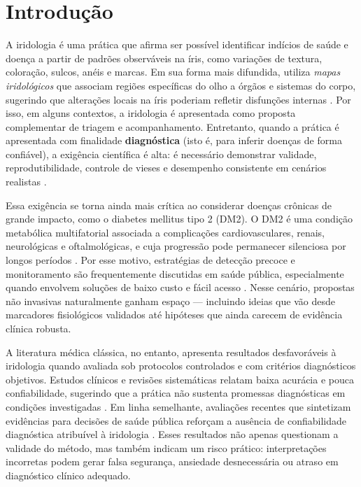 \documentclass[12pt,a4paper]{article}
\begin{document}
\section{Introdução}
A iridologia é uma prática que afirma ser possível identificar indícios de saúde e doença a partir de padrões observáveis na íris, como variações de textura, coloração, sulcos, anéis e marcas. Em sua forma mais difundida, utiliza \textit{mapas iridológicos} que associam regiões específicas do olho a órgãos e sistemas do corpo, sugerindo que alterações locais na íris poderiam refletir disfunções internas \citep{Ernst2000ArchOphthalmol}. Por isso, em alguns contextos, a iridologia é apresentada como proposta complementar de triagem e acompanhamento. Entretanto, quando a prática é apresentada com finalidade \textbf{diagnóstica} (isto é, para inferir doenças de forma confiável), a exigência científica é alta: é necessário demonstrar validade, reprodutibilidade, controle de vieses e desempenho consistente em cenários realistas \citep{AusGovIridology2025}.

Essa exigência se torna ainda mais crítica ao considerar doenças crônicas de grande impacto, como o diabetes mellitus tipo 2 (DM2). O DM2 é uma condição metabólica multifatorial associada a complicações cardiovasculares, renais, neurológicas e oftalmológicas, e cuja progressão pode permanecer silenciosa por longos períodos \citep{WHOdiabetes2024}. Por esse motivo, estratégias de detecção precoce e monitoramento são frequentemente discutidas em saúde pública, especialmente quando envolvem soluções de baixo custo e fácil acesso \citep{WHOdiabetes2024}. Nesse cenário, propostas não invasivas naturalmente ganham espaço --- incluindo ideias que vão desde marcadores fisiológicos validados até hipóteses que ainda carecem de evidência clínica robusta.

A literatura médica clássica, no entanto, apresenta resultados desfavoráveis à iridologia quando avaliada sob protocolos controlados e com critérios diagnósticos objetivos. Estudos clínicos e revisões sistemáticas relatam baixa acurácia e pouca confiabilidade, sugerindo que a prática não sustenta promessas diagnósticas em condições investigadas \citep{Simon1979JAMA, Knipschild1988BMJ, Ernst2000ArchOphthalmol}. Em linha semelhante, avaliações recentes que sintetizam evidências para decisões de saúde pública reforçam a ausência de confiabilidade diagnóstica atribuível à iridologia \citep{AusGovIridology2025}. Esses resultados não apenas questionam a validade do método, mas também indicam um risco prático: interpretações incorretas podem gerar falsa segurança, ansiedade desnecessária ou atraso em diagnóstico clínico adequado.
\end{document}
